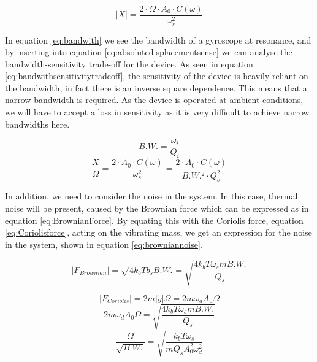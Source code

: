 \documentclass[12pt,a4paper,titlepage]{article}
\begin{document}
\begin{spacing}{1.1}
\begin{equation}
\lvert X \rvert = \dfrac{2 \cdot \Omega \cdot A_0 \cdot C (\omega)}{\omega_s^2}
\label{eq:absolutedisplacementsense}
\end{equation}

In equation \ref{eq:bandwith} we see the bandwidth of a gyroscope at resonance, and by inserting into equation  \ref{eq:absolutedisplacementsense} we can analyse the bandwidth-sensitivity trade-off for the device. As seen in equation \ref{eq:bandwithsensitivitytradeoff}, the sensitivity of the device is heavily reliant on the bandwidth, in fact there is an inverse square dependence. This means that a narrow bandwidth is required. As the device is operated at ambient conditions, we will have to accept a loss in sensitivity as it is very difficult to achieve narrow bandwidths here.

\begin{equation}
B.W.= \dfrac{\omega_i}{Q_i}
\label{eq:bandwith}
\end{equation}
\begin{equation}
\dfrac{X}{\Omega}=\dfrac{2 \cdot A_0 \cdot C (\omega)}{\omega_s^2}=\dfrac{2 \cdot A_0 \cdot C (\omega)}{B.W.^2 \cdot Q_s^2}
\label{eq:bandwithsensitivitytradeoff}
\end{equation}

In addition, we need to consider the noise in the system. In this case, thermal noise will be present, caused by the Brownian force which can be expressed as in equation \ref{eq:BrownianForce}. By equating this with the Coriolis force, equation \ref{eq:Coriolisforce}, acting on the vibrating mass, we get an expression for the noise in the system, shown in equation \ref{eq:browniannoise}.

\begin{equation}
\lvert F_{Brownian}\rvert = \sqrt{4k_b T b_s B.W.} = \sqrt{\dfrac{4k_b T \omega_s m B.W.}{Q_s}}
\label{eq:BrownianForce}
\end{equation}

\begin{equation}
\lvert F_{Coriolis}\rvert = 2 m \lvert \dot{y} \rvert \Omega = 2 m \omega_d A_0 \Omega
\label{eq:Coriolisforce}
\end{equation}
\begin{equation}
2 m \omega_d A_0 \Omega = \sqrt{\dfrac{4k_b T \omega_s m B.W.}{Q_s}}
\label{eq:brownequcori}
\end{equation}
\begin{equation}
\dfrac{\Omega}{\sqrt{B.W.}} = \sqrt{\dfrac{k_b T \omega_s}{m Q_s A_0^2 \omega_d^2}}
\label{eq:browniannoise}
\end{equation}


\end{spacing}
\end{document}
